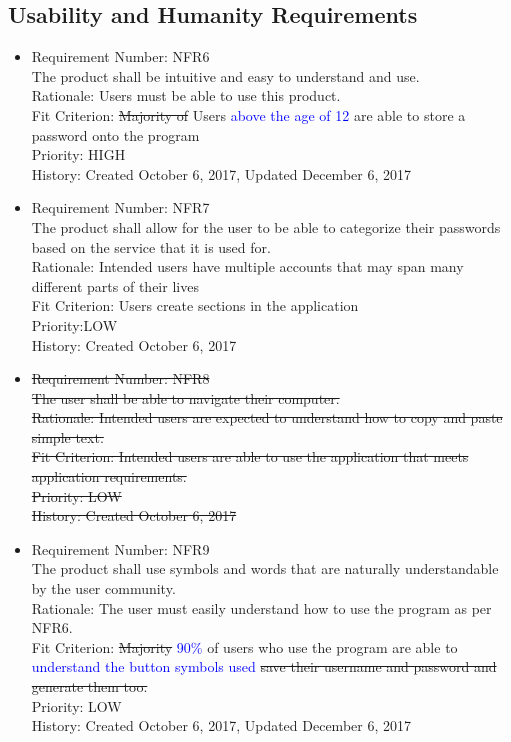 \documentclass[12pt, titlepage]{article}
\begin{document}
\subsection{Usability and Humanity Requirements}
\begin{itemize}
	\item Requirement Number: NFR6\\
The product shall be intuitive and easy to understand and use.\\
Rationale: Users must be able to use this product.\\
Fit Criterion: \sout{Majority of} Users \textcolor{blue}{above the age of 12} are able to store a password onto the program\\
Priority: HIGH\\
History: Created October 6, 2017, Updated December 6, 2017

	\item Requirement Number: NFR7\\
The product shall allow for the user to be able to categorize their passwords based on the service that it is used for.\\
Rationale: Intended users have multiple accounts that may span many different parts of their lives \\
Fit Criterion: Users create sections in the application\\
Priority:LOW\\
History: Created October 6, 2017

	\item \sout{Requirement Number: NFR8}\\
\sout{The user shall be able to navigate their computer.}\\
\sout{Rationale: Intended users are expected to understand how to copy and paste simple text.}\\
\sout{Fit Criterion: Intended users are able to use the application that meets application requirements.}\\
\sout{Priority: LOW}\\
\sout{History: Created October 6, 2017}

	\item Requirement Number: NFR9\\
The product shall use symbols and words that are naturally understandable by the user community.\\
Rationale: The user must easily understand how to use the program as per NFR6.\\
Fit Criterion: \sout{Majority} \textcolor{blue}{90\%} of users who use the program are able to \textcolor{blue}{understand the button symbols used} \sout{save their username and password and generate them too.}\\
Priority: LOW\\
History: Created October 6, 2017, Updated December 6, 2017


\end{itemize}
\end{document}

